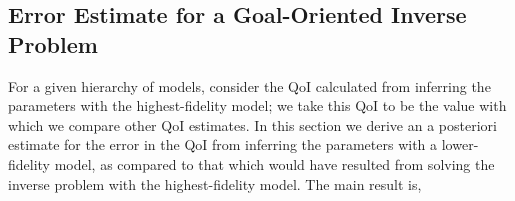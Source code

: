 \subsection[Error Estimate for a Goal-Oriented Inverse Problem]{Error Estimate for a Goal-Oriented Inverse \\Problem}  \label{sec:deriv}
%
For a given hierarchy of models, consider the QoI calculated from inferring the parameters with the highest-fidelity model; we take this QoI to be the value with which we compare other QoI estimates. In this section we derive an a posteriori estimate for the error in the QoI from inferring the parameters with a lower-fidelity model, as compared to that which would have resulted from solving the inverse problem with the highest-fidelity model. The main result is,
%
